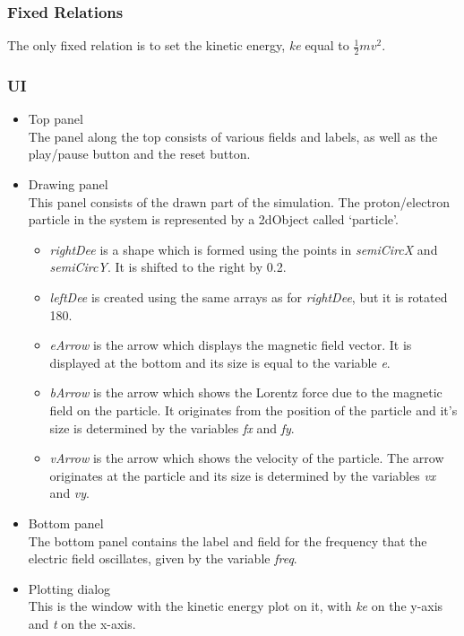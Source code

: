 \subsubsection*{Fixed Relations}
\label{sec-1-3-5}

The only fixed relation is to set the kinetic energy, \emph{ke} equal to $\frac{1}{2}mv^2$.
\subsubsection*{UI}
\label{sec-1-3-6}
\begin{itemize}

\item Top panel\\
\label{sec-1-3-6-1}%
The panel along the top consists of various fields and labels, as well
as the play/pause button and the reset button.

\item Drawing panel\\
\label{sec-1-3-6-2}%
This panel consists of the drawn part of the simulation. The
proton/electron particle in the system is represented by a 2dObject
called `particle'.
\begin{itemize}
\item \emph{rightDee} is a shape which is formed using the points in
  \emph{semiCircX} and \emph{semiCircY}. It is shifted to the right by 0.2.
\item \emph{leftDee} is created using the same arrays as for \emph{rightDee}, but it
  is rotated 180\textdegree{}.
\item \emph{eArrow} is the arrow which displays the magnetic field vector. It
  is displayed at the bottom and its size is equal to the variable \emph{e}.
\item \emph{bArrow} is the arrow which shows the Lorentz force due to the
  magnetic field on the particle. It originates from the position of
  the particle and it's size is determined by the variables \emph{fx} and \emph{fy}.
\item \emph{vArrow} is the arrow which shows the velocity of the particle. The
  arrow originates at the particle and its size is determined by the
  variables \emph{vx} and \emph{vy}.
\end{itemize}

\item Bottom panel\\
\label{sec-1-3-6-3}%
The bottom panel contains the label and field for the frequency that
the electric field oscillates, given by the variable \emph{freq}.

\item Plotting dialog\\
\label{sec-1-3-6-4}%
This is the window with the kinetic energy plot on it, with \emph{ke} on
the y-axis and \emph{t} on the x-axis.
\end{itemize} %
